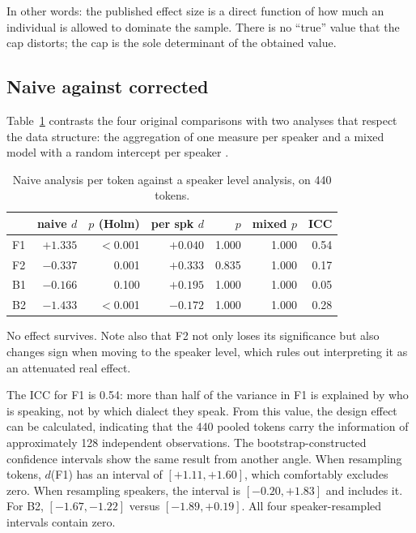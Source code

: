 \documentclass[11pt]{article}
\begin{document}
In other words: the published effect size is a direct function of how much an
individual is allowed to dominate the sample. There is no ``true'' value that the
cap distorts; the cap is the sole determinant of the obtained value.

\subsection{Naive against corrected}

Table~\ref{tab:naive} contrasts the four original comparisons with two analyses
that respect the data structure: the aggregation of one measure per speaker and a
mixed model with a random intercept per speaker \citep{barr2013,winter2019}.

\begin{table}[t]
\centering
\small
\setlength{\tabcolsep}{4pt}
\begin{tabular}{lrrrrrr}
\toprule
 & \makecell{naive\\$d$} & \makecell{$p$\\(Holm)} &
 \makecell{per spk\\$d$} & $p$ & \makecell{mixed\\$p$} & ICC \\
\midrule
F1 & $+1.335$ & $<$0.001 & $+0.040$ & 1.000 & 1.000 & 0.54 \\
F2 & $-0.337$ & 0.001    & $+0.333$ & 0.835 & 1.000 & 0.17 \\
B1 & $-0.166$ & 0.100    & $+0.195$ & 1.000 & 1.000 & 0.05 \\
B2 & $-1.433$ & $<$0.001 & $-0.172$ & 1.000 & 1.000 & 0.28 \\
\bottomrule
\end{tabular}
\caption{Naive analysis per token against a speaker level analysis, on 440
tokens.}
\label{tab:naive}
\end{table}

No effect survives. Note also that F2 not only loses its significance but also
changes sign when moving to the speaker level, which rules out interpreting it as
an attenuated real effect.

The ICC for F1 is 0.54: more than half of the variance in F1 is explained by who
is speaking, not by which dialect they speak. From this value, the design effect
can be calculated, indicating that the 440 pooled tokens carry the information of
approximately 128 independent observations. The bootstrap-constructed confidence
intervals show the same result from another angle. When resampling tokens,
$d$(F1) has an interval of $[+1.11, +1.60]$, which comfortably excludes zero.
When resampling speakers, the interval is $[-0.20, +1.83]$ and includes it. For
B2, $[-1.67, -1.22]$ versus $[-1.89, +0.19]$. All four speaker-resampled
intervals contain zero.
\end{document}
